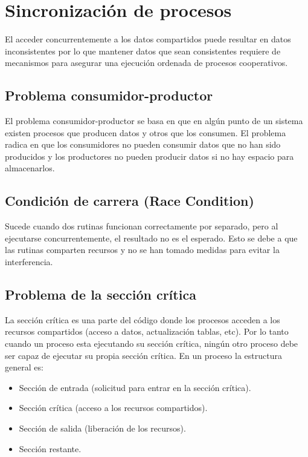 \documentclass{templateNote}
\begin{document}
\section{Sincronización de procesos}

El acceder concurrentemente a los datos compartidos puede resultar en datos inconsistentes por lo que mantener datos que sean consistentes requiere de mecanismos para asegurar una ejecución ordenada de procesos cooperativos.

\subsection*{Problema consumidor-productor}

El problema consumidor-productor se basa en que en algún punto de un sistema existen procesos que producen datos y otros que los consumen. El problema radica en que los consumidores no pueden consumir datos que no han sido producidos y los productores no pueden producir datos si no hay espacio para almacenarlos.

\subsection*{Condición de carrera (Race Condition)}

Sucede cuando dos rutinas funcionan correctamente por separado, pero al ejecutarse concurrentemente, el resultado no es el esperado. Esto se debe a que las rutinas comparten recursos y no se han tomado medidas para evitar la interferencia.

\subsection*{Problema de la sección crítica}

La sección crítica es una parte del código donde los procesos acceden a los recursos compartidos (acceso a datos, actualización tablas, etc). Por lo tanto cuando un proceso esta ejecutando su sección crítica, ningún otro proceso debe ser capaz de ejecutar su propia sección crítica.
En un proceso la estructura general es:
\begin{itemize}
    \item Sección de entrada (solicitud para entrar en la sección crítica).
    \item Sección crítica (acceso a los recursos compartidos).
    \item Sección de salida (liberación de los recursos).
    \item Sección restante.
\end{itemize}
\end{document}
